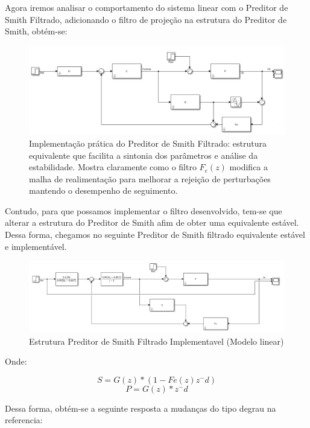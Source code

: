 \documentclass[a4paper,12pt]{article}
\begin{document}
Agora iremos analisar o comportamento do sistema linear com o Preditor de Smith Filtrado, adicionando o filtro de projeção na estrutura do Preditor de Smith, obtém-se:

\begin{figure}[h]
    \centering
    \includegraphics[width=0.9\linewidth]{image2.png}
    \caption{Implementação prática do Preditor de Smith Filtrado: estrutura equivalente que facilita a sintonia dos parâmetros e análise da estabilidade. Mostra claramente como o filtro $F_e(z)$ modifica a malha de realimentação para melhorar a rejeição de perturbações mantendo o desempenho de seguimento.}
    \label{fig:psf_implementation_practical}
\end{figure}

Contudo, para que possamos implementar o filtro desenvolvido, tem-se que alterar a estrutura do Preditor de Smith afim de obter uma equivalente estável. Dessa forma, chegamos no seguinte Preditor de Smith filtrado equivalente estável e implementável.

\begin{figure}[H]
    \centering
    \includegraphics[width=0.9\linewidth]{image3.png}
    \caption{Estrutura Preditor de Smith Filtrado Implementavel (Modelo linear)}
    \label{fig:psf_implementation_linear}
\end{figure}

Onde:

\begin{equation}
S = G(z)*(1-Fe(z)z^-d)
\end{equation}
\begin{equation}
P = G(z)*z^-d
\end{equation}

Dessa forma, obtém-se a seguinte resposta a mudanças do tipo degrau na referencia:
\end{document}
